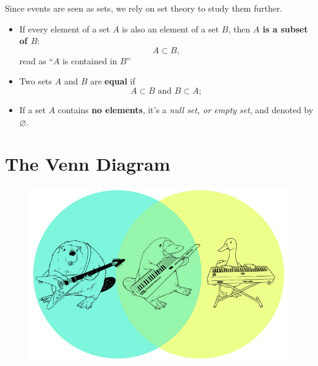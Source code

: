 \documentclass[notes=show]{beamer}\usepackage[]{graphicx}\usepackage[]{color}
\begin{document}
\begin{frame}{\secname}

Since events are seen as sets, we rely on set theory to study them further.
\pause
\begin{definition}
\begin{itemize}
\item If every element of a set $A$ is also an element of a set $B$, then \textbf{$A$ is a subset of $B$}: $$ A \subset B,$$ read as ``$A$ is contained in $B$''
\item Two sets $A$ and $B$ are \textbf{equal} if $$A \subset B \text{ \ and \ } B \subset A;$$
\item If a set $A$ contains \textbf{no elements}, it's a \textit{null set, or empty set}, and denoted by $\varnothing$.
\end{itemize}
\end{definition}
\end{frame}


%
%

\section{The Venn Diagram}

\begin{frame}{\secname}
\begin{figure}[h!]
\centering
\includegraphics[scale=0.4]{../../book/img/fun/R9mJR.jpeg}
\end{figure}
\end{frame}
\end{document}
